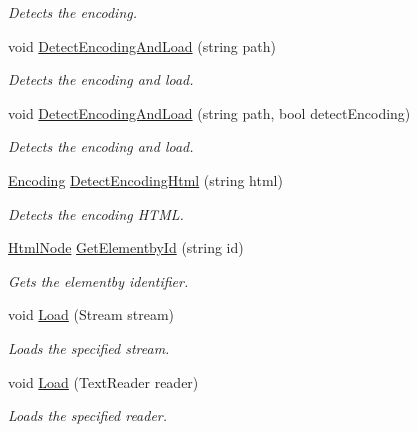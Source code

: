 \begin{DoxyCompactItemize}
\begin{DoxyCompactList}\small\item\em Detects the encoding. \end{DoxyCompactList}\item 
void \hyperlink{class_html_agility_pack_1_1_html_document_a758381d93cc11a8399a368a17f05577d}{Detect\+Encoding\+And\+Load} (string path)
\begin{DoxyCompactList}\small\item\em Detects the encoding and load. \end{DoxyCompactList}\item 
void \hyperlink{class_html_agility_pack_1_1_html_document_a44ea3489f81042acbce1e9824af45d4f}{Detect\+Encoding\+And\+Load} (string path, bool detect\+Encoding)
\begin{DoxyCompactList}\small\item\em Detects the encoding and load. \end{DoxyCompactList}\item 
\hyperlink{class_html_agility_pack_1_1_html_document_a220bdf28a5e35f4898075084be2d59f0}{Encoding} \hyperlink{class_html_agility_pack_1_1_html_document_aadb4046a4fdb71a31fd57357bfd5a5c4}{Detect\+Encoding\+Html} (string html)
\begin{DoxyCompactList}\small\item\em Detects the encoding H\+T\+ML. \end{DoxyCompactList}\item 
\hyperlink{class_html_agility_pack_1_1_html_node}{Html\+Node} \hyperlink{class_html_agility_pack_1_1_html_document_a7844186a975f7d965f8333c998fb8008}{Get\+Elementby\+Id} (string id)
\begin{DoxyCompactList}\small\item\em Gets the elementby identifier. \end{DoxyCompactList}\item 
void \hyperlink{class_html_agility_pack_1_1_html_document_ad242d26abadad4ed8f73e4391333949d}{Load} (Stream stream)
\begin{DoxyCompactList}\small\item\em Loads the specified stream. \end{DoxyCompactList}\item 
void \hyperlink{class_html_agility_pack_1_1_html_document_a54aea4a96c18e6b345fc661d998fbddd}{Load} (Text\+Reader reader)
\begin{DoxyCompactList}\small\item\em Loads the specified reader. \end{DoxyCompactList}\item 

\end{DoxyCompactItemize}
